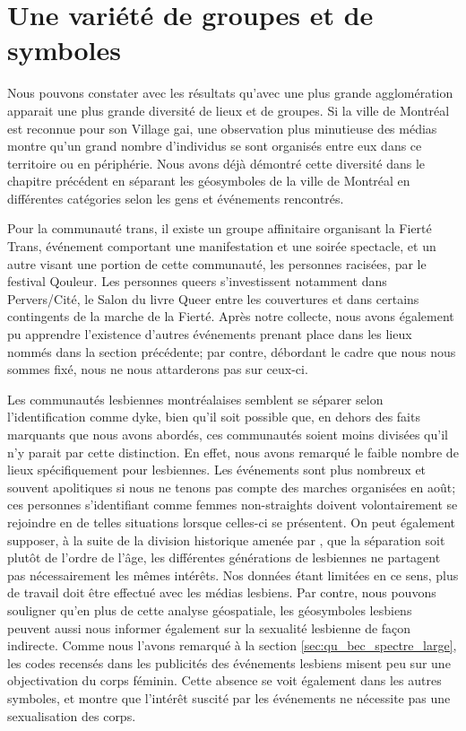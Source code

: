 \section{Une variété de groupes et de symboles}
\label{sec:une_variete_de_groupes_et_de_symboles}
Nous pouvons constater avec les résultats qu'avec une plus grande agglomération apparait une plus grande diversité de lieux et de groupes.
Si la ville de Montréal est reconnue pour son Village gai, une observation plus minutieuse des médias \lgbt montre qu'un grand nombre d'individus se sont organisés entre eux dans ce territoire ou en périphérie.
Nous avons déjà démontré cette diversité dans le chapitre précédent en séparant les géosymboles de la ville de Montréal en différentes catégories selon les gens et événements rencontrés.

Pour la communauté trans, il existe un groupe affinitaire organisant la Fierté Trans, événement comportant une manifestation et une soirée spectacle, et un autre visant une portion de cette communauté, les personnes racisées, par le festival Qouleur.
Les personnes queers s'investissent notamment dans Pervers/Cité, le Salon du livre Queer entre les couvertures et dans certains contingents de la marche de la Fierté.
Après notre collecte, nous avons également pu apprendre l'existence d'autres événements prenant place dans les lieux nommés dans la section précédente; par contre, débordant le cadre que nous nous sommes fixé, nous ne nous attarderons pas sur ceux-ci.

Les communautés lesbiennes montréalaises semblent se séparer selon l'identification comme dyke, bien qu'il soit possible que, en dehors des faits marquants que nous avons abordés, ces communautés soient moins divisées qu'il n'y parait par cette distinction.
En effet, nous avons remarqué le faible nombre de lieux spécifiquement pour lesbiennes.
Les événements sont plus nombreux et souvent apolitiques si nous ne tenons pas compte des marches organisées en août; ces personnes s'identifiant comme femmes non-straights doivent volontairement se rejoindre en de telles situations lorsque celles-ci se présentent.
On peut également supposer, à la suite de la division historique amenée par \citet{Giraud2014}, que la séparation soit plutôt de l'ordre de l'âge, les différentes générations de lesbiennes ne partagent pas nécessairement les mêmes intérêts.
Nos données étant limitées en ce sens, plus de travail doit être effectué avec les médias lesbiens.
Par contre, nous pouvons souligner qu'en plus de cette analyse géospatiale, les géosymboles lesbiens peuvent aussi nous informer également sur la sexualité lesbienne de façon indirecte.
Comme nous l'avons remarqué à la section \ref{sec:qu_bec_spectre_large}, les codes recensés dans les publicités des événements lesbiens misent peu sur une objectivation du corps féminin.
Cette absence se voit également dans les autres symboles, et montre que l'intérêt suscité par les événements ne nécessite pas une sexualisation des corps.

